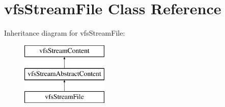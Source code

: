 \hypertarget{classorg_1_1bovigo_1_1vfs_1_1vfs_stream_file}{}\section{vfs\+Stream\+File Class Reference}
\label{classorg_1_1bovigo_1_1vfs_1_1vfs_stream_file}
Inheritance diagram for vfs\+Stream\+File\+:\begin{figure}[H]
\begin{center}
\leavevmode
\includegraphics[height=3.000000cm]{classorg_1_1bovigo_1_1vfs_1_1vfs_stream_file}
\end{center}
\end{figure}
